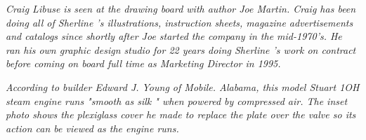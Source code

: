 \bigskip\textit{Craig Libuse is seen at the drawing board with
author Joe Martin. Craig has been doing all of
Sherline 's illustrations, instruction sheets, magazine
advertisements and catalogs since shortly after Joe
started the company in the mid-1970's. He ran his
own graphic design studio for 22 years doing
Sherline 's work on contract before coming on board
full time as Marketing Director in 1995.}\bigskip

\bigskip\textit{According to builder Edward J. Young of Mobile.
Alabama, this model Stuart 1OH steam engine runs
"smooth as silk " when powered by compressed air.
The inset photo shows the plexiglass cover he made
to replace the plate over the valve so its action can
be viewed as the engine runs.}\bigskip

\secup
\secup
